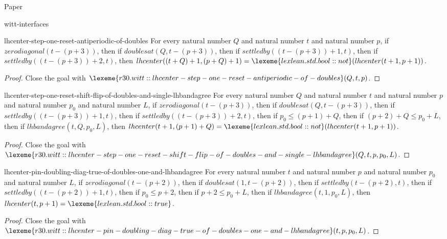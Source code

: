 \begin{lexlean}{Paper}
\begin{section}{witt-interfaces}
  \begin{theorem}{lhcenter-step-one-reset-antiperiodic-of-doubles}
  For every natural number \(Q\) and natural number \(t\) and natural number \(p\), if \(zerodiagonal(t - (p + 3))\), then if \(doublesat(Q, t - (p + 3))\), then if \(settledby((t - (p + 3)) + 1, t)\), then if \(settledby((t - (p + 3)) + 2, t)\), then \(lhcenter((t + Q) + 1, (p + Q) + 1) = \lexeme{lexlean.std.bool::not}(lhcenter(t + 1, p + 1))\).
  \begin{proof}
  Close the goal with \(\lexeme{r30.witt::lhcenter-step-one-reset-antiperiodic-of-doubles}(Q, t, p)\).
  \end{proof}
  \end{theorem}

  \begin{theorem}{lhcenter-step-one-reset-shift-flip-of-doubles-and-single-lhbandagree}
  For every natural number \(Q\) and natural number \(t\) and natural number \(p\) and natural number \(p_0\) and natural number \(L\), if \(zerodiagonal(t - (p + 3))\), then if \(doublesat(Q, t - (p + 3))\), then if \(settledby((t - (p + 3)) + 1, t)\), then if \(settledby((t - (p + 3)) + 2, t)\), then if \(p_0 ≤ (p + 1) + Q\), then if \((p + 2) + Q ≤ p_0 + L\), then if \(lhbandagree(t, Q, p_0, L)\), then \(lhcenter(t + 1, (p + 1) + Q) = \lexeme{lexlean.std.bool::not}(lhcenter(t + 1, p + 1))\).
  \begin{proof}
  Close the goal with \(\lexeme{r30.witt::lhcenter-step-one-reset-shift-flip-of-doubles-and-single-lhbandagree}(Q, t, p, p_0, L)\).
  \end{proof}
  \end{theorem}

  \begin{theorem}{lhcenter-pin-doubling-diag-true-of-doubles-one-and-lhbandagree}
  For every natural number \(t\) and natural number \(p\) and natural number \(p_0\) and natural number \(L\), if \(zerodiagonal(t - (p + 2))\), then if \(doublesat(1, t - (p + 2))\), then if \(settledby(t - (p + 2), t)\), then if \(settledby((t - (p + 2)) + 1, t)\), then if \(p_0 ≤ p + 2\), then if \(p + 2 ≤ p_0 + L\), then if \(lhbandagree(t, 1, p_0, L)\), then \(lhcenter(t, p + 1) = \lexeme{lexlean.std.bool::true}\).
  \begin{proof}
  Close the goal with \(\lexeme{r30.witt::lhcenter-pin-doubling-diag-true-of-doubles-one-and-lhbandagree}(t, p, p_0, L)\).
  \end{proof}
  \end{theorem}


\end{section}
\end{lexlean}
